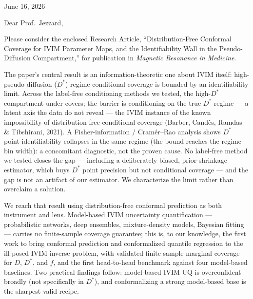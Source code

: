 \documentclass[11pt]{article}
\newcommand{\Dstar}{D^{*}}
\begin{document}
\noindent June 16, 2026

\medskip
\noindent Dear Prof.\ Jezzard,

\medskip
Please consider the enclosed Research Article, ``Distribution-Free Conformal
Coverage for IVIM Parameter Maps, and the Identifiability Wall in the
Pseudo-Diffusion Compartment,'' for publication in \emph{Magnetic Resonance in
Medicine}.

The paper's central result is an information-theoretic one about IVIM itself:
high-pseudo-diffusion ($\Dstar$) regime-conditional coverage is bounded by an
identifiability limit. Across the label-free conditioning methods we tested, the
high-$\Dstar$ compartment under-covers; the barrier is conditioning on the true
$\Dstar$ regime --- a latent axis the data do not reveal --- the IVIM instance of
the known impossibility of distribution-free conditional coverage (Barber, Cand\`es,
Ramdas \& Tibshirani, 2021). A Fisher-information / Cram\'er--Rao analysis shows
$\Dstar$ point-identifiability collapses in the same regime (the bound reaches the
regime-bin width): a concomitant diagnostic, not the proven cause. No label-free
method we tested closes the gap --- including a deliberately biased, prior-shrinkage
estimator, which buys $\Dstar$ point precision but not conditional coverage --- and
the gap is not an artifact of our estimator. We characterize the limit rather than
overclaim a solution.

We reach that result using distribution-free conformal prediction as both instrument
and lens. Model-based IVIM uncertainty quantification --- probabilistic networks,
deep ensembles, mixture-density models, Bayesian fitting --- carries no
finite-sample coverage guarantee; this is, to our knowledge, the first work to bring
conformal prediction and conformalized quantile regression to the ill-posed IVIM
inverse problem, with validated finite-sample marginal coverage for $D$, $\Dstar$,
and $f$, and the first head-to-head benchmark against four model-based baselines.
Two practical findings follow: model-based IVIM UQ is overconfident broadly (not
specifically in $\Dstar$), and conformalizing a strong model-based base is the
sharpest valid recipe.
\end{document}
